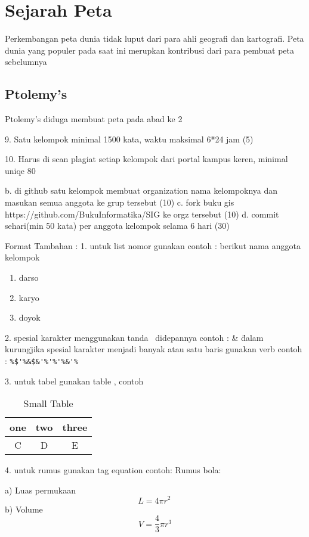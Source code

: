 			\section{Sejarah Peta}
			Perkembangan peta dunia tidak luput dari para ahli geografi dan kartografi. Peta dunia yang populer pada saat ini merupkan kontribusi dari para 
			pembuat peta sebelumnya

			\subsection{Ptolemy's}
			Ptolemy's diduga membuat peta pada abad ke 2
	
		9. Satu kelompok minimal 1500 kata, waktu maksimal 6*24 jam (5)

		10. Harus di scan plagiat setiap kelompok dari portal kampus keren, minimal uniqe 80%






b. di github satu kelompok membuat organization nama kelompoknya dan masukan semua anggota ke grup tersebut (10)
c. fork buku gis https://github.com/BukuInformatika/SIG ke orgz tersebut (10)
d. commit sehari(min 50 kata) per anggota kelompok selama 6 hari (30)




Format Tambahan :
1. untuk list nomor gunakan
	contoh :
	berikut nama anggota kelompok
\begin{enumerate}
	\item darso
	\item karyo
	\item doyok
\end{enumerate}

2. spesial karakter menggunakan tanda \ didepannya
	contoh :
	\&
	\"dalam kurung\"
	jika spesial karakter menjadi banyak atau satu baris gunakan verb
	contoh :
	\verb|%$'%&$&'%'%'%&'%|
	
3. untuk tabel gunakan table , contoh

\begin{table}[h]
\caption{Small Table}
\centering
\begin{tabular}{ccc}
\hline
one&two&three\\
\hline
C&D&E\\
\hline
\end{tabular}
\end{table}

4. untuk rumus gunakan tag equation
	contoh:
	Rumus bola:

	a) Luas permukaan
	 \begin{equation}
	     L = 4 \pi r^2 \,
	\end{equation}
	b) Volume
	 \begin{equation}
	     V = \frac{4}{3}\pi r^3
	\end{equation}